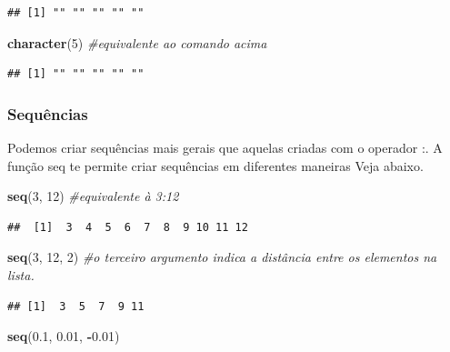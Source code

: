 \documentclass[
]{book}
\newenvironment{Shaded}{\begin{snugshade}}{\end{snugshade}}
\newcommand{\CommentTok}[1]{\textcolor[rgb]{0.56,0.35,0.01}{\textit{#1}}}
\newcommand{\DecValTok}[1]{\textcolor[rgb]{0.00,0.00,0.81}{#1}}
\newcommand{\FloatTok}[1]{\textcolor[rgb]{0.00,0.00,0.81}{#1}}
\newcommand{\FunctionTok}[1]{\textcolor[rgb]{0.13,0.29,0.53}{\textbf{#1}}}
\newcommand{\NormalTok}[1]{#1}
\newcommand{\SpecialCharTok}[1]{\textcolor[rgb]{0.81,0.36,0.00}{\textbf{#1}}}
\begin{document}
\begin{verbatim}
## [1] "" "" "" "" ""
\end{verbatim}

\begin{Shaded}
\begin{Highlighting}[]
\FunctionTok{character}\NormalTok{(}\DecValTok{5}\NormalTok{) }\CommentTok{\#equivalente ao comando acima}
\end{Highlighting}
\end{Shaded}

\begin{verbatim}
## [1] "" "" "" "" ""
\end{verbatim}

\subsubsection{Sequências}\label{S:sequencia}

Podemos criar sequências mais gerais que aquelas criadas com o operador :.
A função seq te permite criar sequências em diferentes maneiras
Veja abaixo.

\begin{Shaded}
\begin{Highlighting}[]
\FunctionTok{seq}\NormalTok{(}\DecValTok{3}\NormalTok{, }\DecValTok{12}\NormalTok{) }\CommentTok{\#equivalente à 3:12}
\end{Highlighting}
\end{Shaded}

\begin{verbatim}
##  [1]  3  4  5  6  7  8  9 10 11 12
\end{verbatim}

\begin{Shaded}
\begin{Highlighting}[]
\FunctionTok{seq}\NormalTok{(}\DecValTok{3}\NormalTok{, }\DecValTok{12}\NormalTok{, }\DecValTok{2}\NormalTok{) }\CommentTok{\#o terceiro argumento indica a distância entre os elementos na lista.}
\end{Highlighting}
\end{Shaded}

\begin{verbatim}
## [1]  3  5  7  9 11
\end{verbatim}

\begin{Shaded}
\begin{Highlighting}[]
\FunctionTok{seq}\NormalTok{(}\FloatTok{0.1}\NormalTok{, }\FloatTok{0.01}\NormalTok{, }\SpecialCharTok{{-}}\FloatTok{0.01}\NormalTok{)}
\end{Highlighting}
\end{Shaded}
\end{document}
